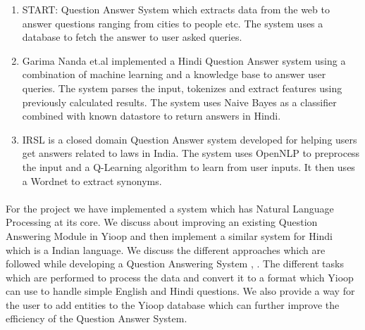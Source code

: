 \begin{enumerate}
\item START: Question Answer System \cite{katz1997annotating} which extracts data from the web to answer questions ranging from cities to people etc. The system uses a database to fetch the answer to user asked queries. 

\item
Garima Nanda et.al implemented a Hindi Question Answer system \cite {nanda2016hindi} using a combination of machine learning and a knowledge base to answer user queries. The system parses the input, tokenizes and extract features using previously calculated results. The system uses  Naive Bayes as a classifier combined with known datastore to return answers in Hindi.

\item
IRSL \cite {sangeetha2017information} is a closed domain Question Answer system developed for helping users get answers related to laws in India. The system uses OpenNLP to preprocess the input and a Q-Learning algorithm to learn from user inputs. It then uses a Wordnet to extract synonyms.

\end{enumerate}

\paragraph{}
For the project we have implemented a system which has Natural Language Processing at its core. We discuss about improving an existing Question Answering Module \cite {patel2015question} in Yioop and then implement a similar system for Hindi which is a Indian language. We discuss the different approaches which are followed while developing a Question Answering System \cite {simmons1970natural}, \cite{waltz1978english}. The different tasks which are performed to process the data and convert it to a format which Yioop can use to handle simple English and Hindi questions. We also provide a way for the user to add entities to the Yioop database which can further improve the efficiency of the Question Answer System.
